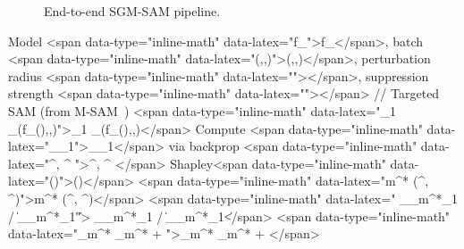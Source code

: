 \documentclass[10pt]{article}\usepackage[utf8]{inputenc}\usepackage[T1]{fontenc}\usepackage{amsmath,amssymb,amsfonts,bm}\usepackage{booktabs}\usepackage{multirow}\usepackage{array}\usepackage{graphicx}\usepackage{algorithm}\usepackage{algorithmic}\usepackage{xcolor}\usepackage[margin=1in]{geometry}\usepackage{microtype}
\begin{document}
\begin{figure}[t]
\centering
{}
\caption{End-to-end SGM-SAM pipeline.}
\label{fig:pipeline}
\end{figure}

\begin{algorithm}[t]\caption{SGM-SAM Training Step}\label{alg:sgmsam}
\begin{algorithmic}\small
\REQUIRE Model <span data-type="inline-math" data-latex="f_\theta">f_\theta</span>, batch <span data-type="inline-math" data-latex="(,,\boldsymbol{\delta})">(,,\boldsymbol{\delta})</span>, perturbation radius <span data-type="inline-math" data-latex="\rho">\rho</span>, suppression strength <span data-type="inline-math" data-latex="\alpha">\alpha</span>
\STATE // Targeted SAM (from M-SAM~\cite{rajoli2025msam})
\STATE <span data-type="inline-math" data-latex="_1 \leftarrow {}_{}(f_\theta(),,\boldsymbol{\delta})">_1 \leftarrow {}_{}(f_\theta(),,\boldsymbol{\delta})</span>
\STATE Compute <span data-type="inline-math" data-latex="\nabla_\theta {}_1">\nabla_\theta {}_1</span> via backprop
\STATE <span data-type="inline-math" data-latex="\phi^{}, \phi^{} \leftarrow">\phi^{}, \phi^{} \leftarrow</span> Shapley<span data-type="inline-math" data-latex="()">()</span> 
\STATE <span data-type="inline-math" data-latex="m^* \leftarrow \arg\max(\phi^{}, \phi^{})">m^* \leftarrow \arg\max(\phi^{}, \phi^{})</span>
\STATE <span data-type="inline-math" data-latex="\boldsymbol{\epsilon} \leftarrow \rho \cdot \nabla_{\theta_{m^*}}_1 / \|\nabla_{\theta_{m^*}}_1\|">\boldsymbol{\epsilon} \leftarrow \rho \cdot \nabla_{\theta_{m^*}}_1 / \|\nabla_{\theta_{m^*}}_1\|</span> 
\STATE <span data-type="inline-math" data-latex="\theta_{m^*} \leftarrow \theta_{m^*} + \boldsymbol{\epsilon}">\theta_{m^*} \leftarrow \theta_{m^*} + \boldsymbol{\epsilon}</span>

\end{algorithmic}
\end{algorithm}
\end{document}
